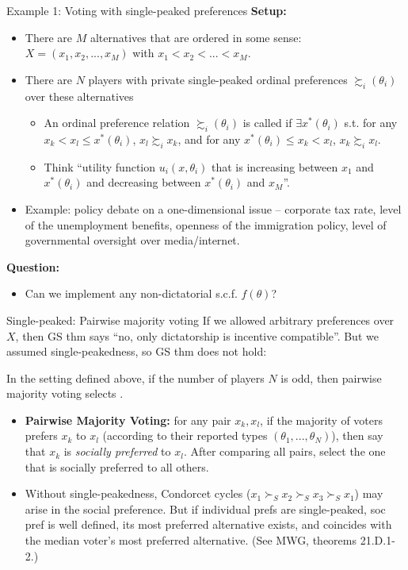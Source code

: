 \documentclass[english,10pt
,aspectratio=169
]{beamer}
\begin{document}
\begin{frame}{Example 1: Voting with single-peaked preferences}
	\textbf{Setup:}
	\begin{itemize}
		\item There are $M$ alternatives that are ordered in some sense: \\
		$X = (x_1, x_2, ..., x_M)$ with $x_1 < x_2 < ... < x_M$.
		\item There are $N$ players with private single-peaked ordinal preferences $\succsim_i(\theta_i)$ over these alternatives
		\begin{itemize}
			\item An ordinal preference relation $\succsim_i(\theta_i)$ is called  if $\exists x^*(\theta_i)$ s.t. for any $x_k < x_l\leq x^*(\theta_i)$, $x_l \succsim_i x_k$, and for any $x^*(\theta_i) \leq x_k < x_l$, $x_k \succsim_i x_l$.
			\item Think ``utility function $u_i(x,\theta_i)$ that is increasing between $x_1$ and $x^*(\theta_i)$ and decreasing between $x^*(\theta_i)$ and $x_M$''.
		\end{itemize}
		\item \alert{Example}: policy debate on a one-dimensional issue -- corporate tax rate, level of the unemployment benefits, openness of the immigration policy, level of governmental oversight over media/internet.
	\end{itemize}
	\textbf{Question:}
	\begin{itemize}
		\item Can we implement any non-dictatorial s.c.f. $f(\theta)$?
	\end{itemize}
\end{frame}


\begin{frame}{Single-peaked: Pairwise majority voting}
	If we allowed arbitrary preferences over $X$, then GS thm says ``no, only dictatorship is incentive compatible''. But we assumed single-peakedness, so GS thm does not hold:
	\begin{theorem}
		In the setting defined above, if the number of players $N$ is odd, then \alert{pairwise majority voting} selects .
	\end{theorem}
	\begin{itemize}
		\item \textbf{Pairwise Majority Voting:} for any pair $x_k, x_l$, if the majority of voters prefers $x_k$ to $x_l$ (according to their reported types $(\theta_1,...,\theta_N)$), then say that $x_k$ is \emph{socially preferred} to $x_l$. After comparing all pairs, select the one that is socially preferred to all others.
		\item Without single-peakedness, Condorcet cycles ($x_1 \succ_S x_2 \succ_S x_3 \succ_S x_1$) may arise in the social preference. But if individual prefs are single-peaked, soc pref is well defined, its most preferred alternative exists, and coincides with the median voter's most preferred alternative. (See MWG, theorems 21.D.1-2.)
	\end{itemize}
\end{frame}
\end{document}
